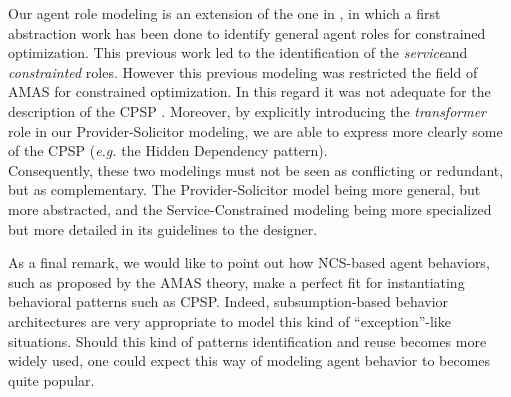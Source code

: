 Our agent role modeling is an extension of the one in \cite{Ka2011.6}, in which a first abstraction work has been done to identify general agent roles for constrained optimization. This previous work led to the identification of the \emph{service}and  \emph{constrainted} roles. However this previous modeling was restricted the field of AMAS for constrained optimization. In this regard it was not adequate for the description of the CPSP . Moreover, by explicitly introducing the \emph{transformer} role in our Provider-Solicitor modeling, we are able to express more clearly some of the CPSP (\emph{e.g.} the Hidden Dependency pattern).\\
Consequently, these two modelings must not be seen as conflicting or redundant, but as complementary. The Provider-Solicitor model being more general, but more abstracted, and the Service-Constrained modeling being more specialized but more detailed in its guidelines to the designer.

As a final remark, we would like to point out how NCS-based agent behaviors, such as proposed by the AMAS theory, make a perfect fit for instantiating behavioral patterns such as CPSP. Indeed, subsumption-based behavior architectures are very appropriate to model this kind of \enquote{exception}-like situations. Should this kind of patterns identification and reuse becomes more widely used, one could expect this way of modeling agent behavior to becomes quite popular.
